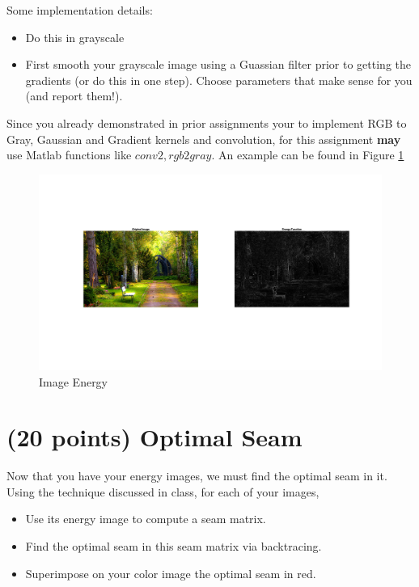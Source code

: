 \documentclass[12pt]{article}
\begin{document}
\noindent
Some implementation details:
\begin{itemize}
\item Do this in grayscale
\item First smooth your grayscale image using a Guassian filter prior to getting the gradients (or do this in one step).  Choose parameters that make sense for you (and report them!).
\end{itemize}

\noindent
Since you already demonstrated in prior assignments your to implement RGB to Gray, Gaussian and Gradient kernels and convolution, for this assignment \textbf{may} use Matlab functions like $conv2, rgb2gray$.
\noindent
An example can be found in Figure \ref{fig1}

\begin{figure}[H]
\begin{center}
\includegraphics{energy.png}
\caption{Image Energy}
\label{fig1}
\end{center}
\end{figure}

\newpage

\section{(20 points) Optimal Seam}
Now that you have your energy images, we must find the optimal seam in it.\\

\noindent
Using the technique discussed in class, for each of your images, 

\begin{itemize}
\item Use its energy image to compute a seam matrix.
\item Find the optimal seam in this seam matrix via backtracing.
\item Superimpose on your color image the optimal seam in red.
\end{itemize}
\end{document}
